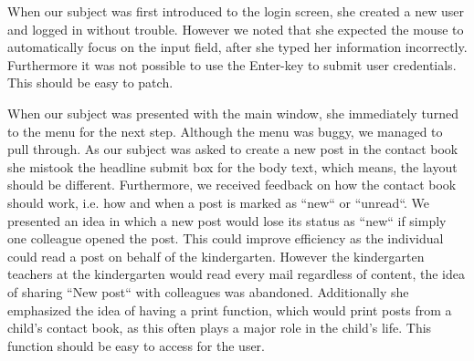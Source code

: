 When our subject was first introduced to the login screen, she created a new user and logged in without trouble. However we noted that she expected the mouse to automatically focus on the input field, after she typed her information incorrectly. Furthermore it was not possible to use the Enter-key to submit user credentials. This should be easy to patch.

When our subject was presented with the main window, she immediately turned to the menu for the next step. Although the menu was buggy, we managed to pull through. As our subject was asked to create a new post in the contact book she mistook the headline submit box for the body text, which means, the layout should be different. 
Furthermore, we received feedback on how the contact book should work, i.e. how and when a post is marked as ``new`` or ``unread``. We presented an idea in which a new post would lose its status as ``new`` if simply one colleague opened the post. This could improve efficiency as the individual could read a post on behalf of the kindergarten. However the kindergarten teachers at the kindergarten would read every mail regardless of content, the idea of sharing ``New post`` with colleagues was abandoned. 
Additionally she emphasized the idea of having a print function, which would print posts from a child's contact book, as this often plays a major role in the child's life. This function should be easy to access for the user.


